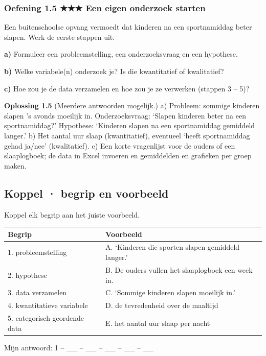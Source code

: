 \subsubsection*{Oefening 1.5 \quad ★★★ \quad Een eigen onderzoek starten}

Een buitenschoolse opvang vermoedt dat kinderen na een sportnamiddag beter slapen. Werk de eerste stappen uit.

\textbf{a)} Formuleer een probleemstelling, een onderzoeksvraag en een hypothese. \lijn

\textbf{b)} Welke variabele(n) onderzoek je? Is die kwantitatief of kwalitatief? \lijn

\textbf{c)} Hoe zou je de data verzamelen en hoe zou je ze verwerken (stappen 3 – 5)? \lijn

\begin{oplossing}
\textbf{Oplossing 1.5} \quad (Meerdere antwoorden mogelijk.) a) Probleem: sommige kinderen slapen ’s avonds moeilijk in. Onderzoeksvraag: ‘Slapen kinderen beter na een sportnamiddag?’ Hypothese: ‘Kinderen slapen na een sportnamiddag gemiddeld langer.’ b) Het aantal uur slaap (kwantitatief), eventueel ‘heeft sportnamiddag gehad ja/nee’ (kwalitatief). c) Een korte vragenlijst voor de ouders of een slaaplogboek; de data in Excel invoeren en gemiddelden en grafieken per groep maken.
\end{oplossing}

\subsection*{Koppel · begrip en voorbeeld}

Koppel elk begrip aan het juiste voorbeeld.

\begin{tabular}{ll}
\hline
Begrip & Voorbeeld \\
\hline
1. probleemstelling & A. ‘Kinderen die sporten slapen gemiddeld langer.’ \\
2. hypothese & B. De ouders vullen het slaaplogboek een week in. \\
3. data verzamelen & C. ‘Sommige kinderen slapen moeilijk in.’ \\
4. kwantitatieve variabele & D. de tevredenheid over de maaltijd \\
5. categorisch geordende data & E. het aantal uur slaap per nacht \\
\hline
\end{tabular}

Mijn antwoord: 1 – \_\_ – \_\_ – \_\_ – \_\_ – \_\_

